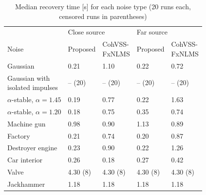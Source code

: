 \begin{table}[tbp]
\centering
\caption{Median recovery time [s] for each noise type (20 runs each, censored runs in parentheses)}
\label{tab:atsip-12}
\begin{tabular}{lllll}
\toprule
 & \multicolumn{2}{l}{Close source} & \multicolumn{2}{l}{Far source} \\
Noise & Proposed & \makecell[l]{CohVSS-\\FxNLMS} & Proposed & \makecell[l]{CohVSS-\\FxNLMS} \\
\midrule
Gaussian & 0.21 & 1.10 & 0.22 & 0.72 \\
\makecell[l]{Gaussian with\\isolated impulses} & -- (20) & -- (20) & -- (20) & -- (20) \\
$\alpha$-stable, $\alpha = 1.45$ & 0.19 & 0.77 & 0.22 & 1.63 \\
$\alpha$-stable, $\alpha = 1.20$ & 0.18 & 0.75 & 0.35 & 0.74 \\
Machine gun & 0.98 & 0.90 & 1.13 & 0.89 \\
Factory & 0.21 & 0.74 & 0.20 & 0.87 \\
Destroyer engine & 0.23 & 0.90 & 0.22 & 1.26 \\
Car interior & 0.26 & 0.18 & 0.27 & 0.42 \\
Valve & 4.30 (8) & 4.30 (8) & 4.30 (8) & 4.30 (8) \\
Jackhammer & 1.18 & 1.18 & 1.18 & 1.18 \\
\bottomrule
\end{tabular}
\end{table}
